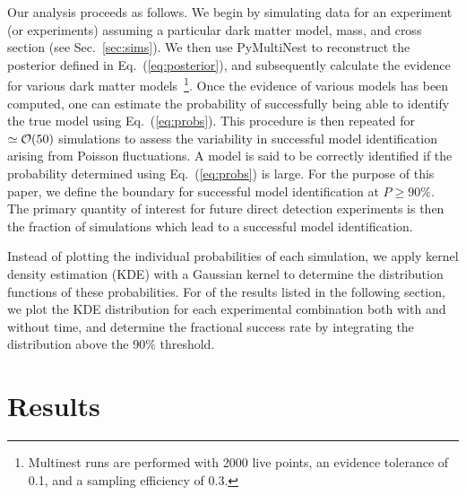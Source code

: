 \documentclass[11pt]{article}
\newcommand{\Eq}[1]{Eq.~(\ref{#1})} \newcommand{\Eqs}[2]{Eqs.~(\ref{#1}) and (\ref{#2})} \newcommand{\Eqm}[2]{Eqs.~(\ref{#1}) through (\ref{#2})}
\begin{document}
Our analysis proceeds as follows. We begin by simulating data for an experiment (or experiments) assuming a particular dark matter model, mass, and cross section (see Sec.~\ref{sec:sims}). We then use PyMultiNest to reconstruct the posterior defined in \Eq{eq:posterior}, and subsequently calculate the evidence for various dark matter models~\cite{pymultinest,Feroz:2008xx}\footnote{Multinest runs are performed with 2000 live points, an evidence tolerance of 0.1, and a sampling efficiency of 0.3.}. Once the evidence of various models has been computed, one can estimate the probability of successfully being able to identify the true model using \Eq{eq:probs}. This procedure is then repeated for $\simeq {\cal O}(50)$ simulations to assess the variability in successful model identification arising from Poisson fluctuations. A model is said to be correctly identified if the probability determined using \Eq{eq:probs} is large. For the purpose of this paper, we define the boundary for successful model identification at $P \geq 90\%$. The primary quantity of interest for future direct detection experiments is then the fraction of simulations which lead to a successful model identification.    

Instead of plotting the individual probabilities of each simulation, we apply kernel density estimation (KDE) with a Gaussian kernel to determine the distribution functions of these probabilities. For of the results listed in the following section, we plot the KDE distribution for each experimental combination both with and without time, and determine the fractional success rate by integrating the distribution above the 90\% threshold. 


\section{Results}\label{sec:results}
\end{document}
